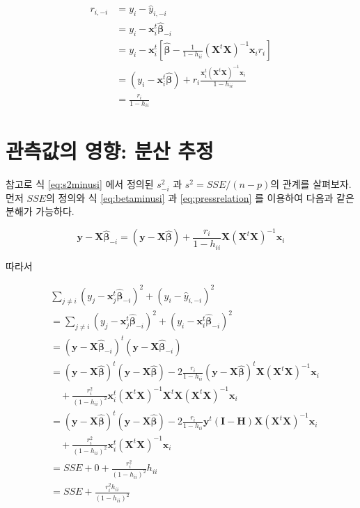 \documentclass[
]{book}
\theoremstyle{definition}
\theoremstyle{definition}
\theoremstyle{definition}
\theoremstyle{definition}
\theoremstyle{remark}
\begin{document}
\begin{align}
r_{i,-i} & =   y_i - \hat y_{i,-i} \\
 & =y_i - \bm x^t_i \hat{ \bm \beta}_{-i}  \\
& = y_i - \bm x^t_i  \left [ \hat{ \bm \beta} - \frac{1}{1-h_{ii}} (\bm X^t \bm X)^{-1}  \bm x_i r_i \right ] \\
&= (y_i - \bm x^t_i \hat{ \bm \beta}) +   r_i  \frac{\bm x^t_i (\bm X^t \bm X)^{-1}  \bm x_i}{1-h_{ii}} \\
&= \frac{r_i}{1-h_{ii}}
\label{eq:pressrelation}
\end{align}

\hypertarget{uxad00uxce21uxac12uxc758-uxc601uxd5a5-uxbd84uxc0b0-uxcd94uxc815}{%
\section{관측값의 영향: 분산 추정}\label{uxad00uxce21uxac12uxc758-uxc601uxd5a5-uxbd84uxc0b0-uxcd94uxc815}}

참고로 식 \eqref{eq:s2minusi} 에서 정의된 \(s^2_{-i}\) 과
\(s^2 = SSE/(n-p)\)의 관계를 살펴보자. 먼저 \(SSE\)의 정의와 식
\eqref{eq:betaminusi} 과 \eqref{eq:pressrelation} 를 이용하여 다음과 같은
분해가 가능하다.

\[ 
\bm y - {\bm X} \hat{ \bm \beta}_{-i}  = ( \bm y - {\bm X} \hat{ \bm \beta}) + 
\frac{r_i}{1-h_{ii}} \bm X (\bm X^t \bm X)^{-1}  \bm x_i 
\]

따라서

\begin{align}
& \sum_{j \ne i} (y_j - {\bm x}_j^t \hat{ \bm \beta}_{-i} )^2   + (y_i - \hat {y}_{i,-i} )^2 \\
 & = \sum_{j \ne i} (y_j - {\bm x}_j^t \hat{ \bm \beta}_{-i} )^2   + (y_i - {\bm x}_i^t \hat{ \bm \beta}_{-i} )^2  \\
  & = ( \bm y - \bm X \hat {\bm \beta}_{-i})^t ( \bm y - \bm X \hat {\bm \beta}_{-i}) \\
  & = ( \bm y - \bm X \hat {\bm \beta})^t ( \bm y - \bm X \hat {\bm \beta})
   -2 \frac{r_i}{1-h_{ii}} ( \bm y - \bm X \hat {\bm \beta})^t  \bm X (\bm X^t \bm X)^{-1}  \bm x_i  \\
   & \quad + \frac{r^2_i}{(1-h_{ii})^2} \bm x_i^t  (\bm X^t \bm X)^{-1} \bm X^t \bm X (\bm X^t \bm X)^{-1}  \bm x_i  \\
   & = ( \bm y - \bm X \hat {\bm \beta})^t ( \bm y - \bm X \hat {\bm \beta})
   -2 \frac{r_i}{1-h_{ii}}  \bm y^t(\bm I - \bm H)  \bm X (\bm X^t \bm X)^{-1}  \bm x_i  \\
   & \quad  + \frac{r^2_i}{(1-h_{ii})^2} \bm x_i^t (\bm X^t \bm X)^{-1}  \bm x_i  \\
    & = SSE + 0 + \frac{r^2_i}{(1-h_{ii})^2} h_{ii}  \\
    & = SSE  + \frac{r^2_i h_{ii}}{(1-h_{ii})^2}   
\label{eq:sseminusi}
\end{align}
\end{document}
